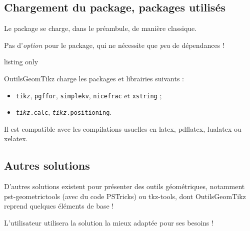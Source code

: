 \documentclass[french,a4paper,11pt]{article}
\providecommand\PSTricks{\textsf{PSTricks}\xspace}
\begin{document}
\subsection{Chargement du package, packages utilisés}

\begin{importantblock}
Le package se charge, dans le préambule, de manière classique.

Pas d'\textit{option} pour le package, qui ne nécessite que \textit{peu} de dépendances !
\end{importantblock}

\begin{PresentationCode}{listing only}
\usepackage{OutilsGeomTikz}
\end{PresentationCode}

\begin{noteblock}
\textsf{OutilsGeomTikz} charge les packages et librairies suivants :

\begin{itemize}
	\item \texttt{tikz}, \texttt{pgffor}, \texttt{simplekv}, \texttt{nicefrac} et \texttt{xstring} ;
	\item \texttt{\textit{tikz}.calc}, \texttt{\textit{tikz}.positioning}.
\end{itemize}

Il est compatible avec les compilations usuelles en \textsf{latex}, \textsf{pdflatex}, \textsf{lualatex} ou \textsf{xelatex}.
\end{noteblock}

\subsection{Autres solutions}

\begin{noteblock}
D'autres solutions existent pour présenter des outils géométriques, notamment \textsf{pst-geometrictools}\footnotemark{} (avec du code \PSTricks) ou \textsf{tkz-tools}\footnotemark{}, dont \textsf{OutilsGeomTikz} reprend quelques éléments de base  !

\smallskip

L'utilisateur utilisera la solution la mieux adaptée pour ses besoins !
\end{noteblock}
\end{document}
